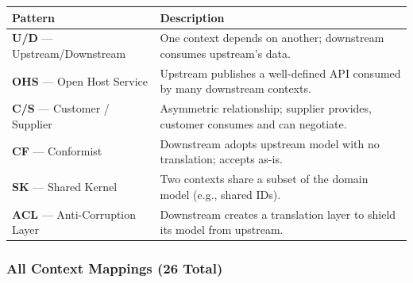 \documentclass[12pt,a4paper]{article}
\begin{document}
\begin{center}
\begin{tabular}{@{}lp{10cm}@{}}
\toprule
\textbf{Pattern} & \textbf{Description} \\
\midrule
\textbf{U/D} — Upstream/Downstream & One context depends on another; downstream consumes upstream's data. \\
\textbf{OHS} — Open Host Service & Upstream publishes a well-defined API consumed by many downstream contexts. \\
\textbf{C/S} — Customer / Supplier & Asymmetric relationship; supplier provides, customer consumes and can negotiate. \\
\textbf{CF} — Conformist & Downstream adopts upstream model with no translation; accepts as-is. \\
\textbf{SK} — Shared Kernel & Two contexts share a subset of the domain model (e.g., shared IDs). \\
\textbf{ACL} — Anti-Corruption Layer & Downstream creates a translation layer to shield its model from upstream. \\
\bottomrule
\end{tabular}
\end{center}

\vspace{0.8em}

\subsubsection*{All Context Mappings (26 Total)}
\end{document}
